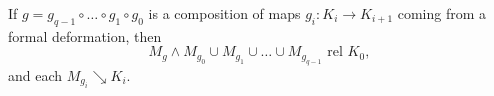 If $g = g_{q-1} \circ \dots \circ g_1 \circ g_0$ is a composition of maps $g_i: K_i \to K_{i+1}$ coming from a formal deformation, then
$$M_g \wedge M_{g_0} \cup M_{g_1} \cup \dots \cup M_{g_{q-1}} \text{ rel } K_0,$$
and each $M_{g_i} \searrow K_i$.
